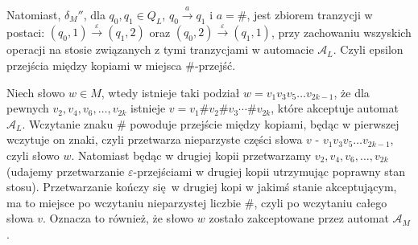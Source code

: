 \documentclass[a4paper]{article}
\renewcommand\qedsymbol{\scalebox{0.75}{$\blacksquare$}}%
\newcommand{\eps}{\varepsilon}%
\newcommand{\aut}[1]{\mathcal {#1}}%
\newcommand{\tran}[1]{\xrightarrow{#1}}%
\begin{document}
Natomiast, $\delta_M''$, dla $q_0, q_1 \in Q_L$, $q_0\tran a q_1$ i $a = \#$, jest zbiorem tranzycji w postaci: $(q_0, 1)\tran \eps (q_1, 2)$ oraz $(q_0, 2)\tran \eps (q_1, 1)$, przy zachowaniu wszyskich operacji na stosie związanych z tymi tranzycjami w automacie $\aut A_L$. Czyli epsilon przejścia między kopiami w miejsca $\#$-przejść.

Niech słowo $w \in M$, wtedy istnieje taki podział $w=v_1v_3v_5\ldots v_{2k-1}$, że dla pewnych $v_2, v_4, v_6,\ldots, v_{2k}$ istnieje $v=v_1\#v_2\#v_3\cdots\#v_{2k}$, które akceptuje automat $\aut A_L$. Wczytanie znaku $\#$ powoduje przejście między kopiami, będąc w pierwszej wczytuje on znaki, czyli przetwarza nieparzyste części słowa $v$ - $v_1v_3v_5\ldots v_{2k-1}$, czyli słowo $w$. Natomiast będąc w drugiej kopii przetwarzamy $v_2, v_4, v_6, \ldots, v_{2k}$ (udajemy przetwarzanie $\eps$-przejściami w drugiej kopii utrzymując poprawny stan stosu). Przetwarzanie kończy się w drugiej kopi w jakimś stanie akceptującym, ma to miejsce po wczytaniu nieparzystej liczbie $\#$, czyli po wczytaniu całego słowa $v$. Oznacza to również, że słowo $w$ zostało zakceptowane przez automat $\aut A_M$.

\qedsymbol
\end{document}
